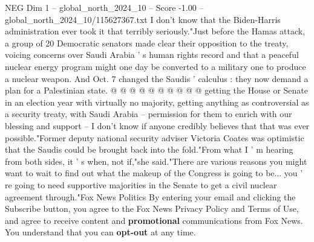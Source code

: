 \begin{textsample}{NEG Dim 1 – global\_north\_2024\_10 – Score -1.00 – global\_north\_2024\_10/115627367.txt}
I don't know that the Biden-Harris administration ever took it that terribly seriously."Just before the Hamas attack, a group of 20 Democratic senators made clear their opposition to the treaty, voicing concerns over Saudi Arabia ' s human rights record and that a peaceful nuclear energy program might one day be converted to a military one to produce a nuclear weapon.
And Oct. 7 changed the Saudis ' calculus : they now demand a plan for a Palestinian state. @ @ @ @ @ @ @ @ @ @ getting the House or Senate in an election year with virtually no majority, getting anything as controversial as a security treaty, with Saudi Arabia -- permission for them to enrich with our blessing and support -- I don't know if anyone credibly believes that that was ever possible."Former deputy national security adviser Victoria Coates was optimistic that the Saudis could be brought back into the fold."From what I ' m hearing from both sides, it ' s when, not if,"she said."There are various reasons you might want to wait to find out what the makeup of the Congress is going to be... you ' re going to need supportive majorities in the Senate to get a civil nuclear agreement through."Fox News Politics By entering your email and clicking the Subscribe button, you agree to the Fox News Privacy Policy and Terms of Use, and agree to receive content and \textbf{promotional} communications from Fox News.
You understand that you can \textbf{opt-out} at any time.

\end{textsample}
